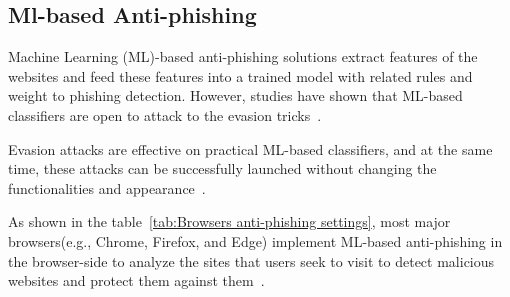 \subsection{Ml-based Anti-phishing}
Machine Learning (ML)-based anti-phishing solutions extract features of the websites and feed these features into a trained model with related rules and weight to phishing detection. However, studies have shown that ML-based classifiers are open to attack to the evasion tricks~\cite{lei2020advanced,laskov2014practical,chen2018automated,xuposter,hu2017black,anderson2019adversarial,aleroud2020bypassing,sabir2020evasion}. 

Evasion attacks are effective on practical ML-based classifiers, and at the same time, these attacks can be successfully launched without changing the functionalities and appearance~\cite{lei2020advanced}.

As shown in the table~\ref{tab:Browsers anti-phishing settings}, most major browsers(e.g., Chrome, Firefox, and Edge) implement ML-based anti-phishing in the browser-side to analyze the sites that users seek to visit to detect malicious websites and protect them against them~\cite{mjcaparas,whittaker2010large}.


